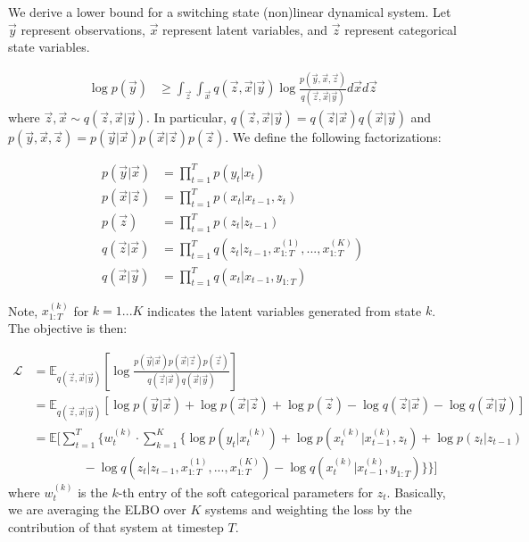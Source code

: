 \documentclass[12pt]{article}
\begin{document}
We derive a lower bound for a switching state (non)linear dynamical system. Let $\vec{y}$ represent observations, $\vec{x}$ represent latent variables, and $\vec{z}$ represent categorical state variables.

\begin{align}
    \log p(\vec{y}) &\geq \int_{\vec{z}} \int_{\vec{x}} q(\vec{z},\vec{x}|\vec{y}) \log \frac{p(\vec{y},\vec{x},\vec{z})}{q(\vec{z},\vec{x}|\vec{y})} d\vec{x} d\vec{z}
\end{align}
where $\vec{z},\vec{x} \sim q(\vec{z},\vec{x}|\vec{y})$. In particular, $q(\vec{z},\vec{x}|\vec{y}) = q(\vec{z}|\vec{x})q(\vec{x}|\vec{y})$ and $p(\vec{y},\vec{x},\vec{z}) = p(\vec{y}|\vec{x})p(\vec{x}|\vec{z})p(\vec{z})$. We define the following factorizations:

\begin{align}
    p(\vec{y}|\vec{x}) &= \prod_{t=1}^T p(y_t|x_t) \\
    p(\vec{x}|\vec{z}) &= \prod_{t=1}^T p(x_t|x_{t-1},z_t) \\
    p(\vec{z}) &= \prod_{t=1}^T p(z_t|z_{t-1}) \\
    q(\vec{z}|\vec{x}) &= \prod_{t=1}^T q(z_t|z_{t-1},x^{(1)}_{1:T},...,x^{(K)}_{1:T}) \\
    q(\vec{x}|\vec{y}) &= \prod_{t=1}^T q(x_t|x_{t-1},y_{1:T})
\end{align}

Note, $x^{(k)}_{1:T}$ for $k=1...K$ indicates the latent variables generated from state $k$. The objective is then:

\begin{align}
    \mathcal{L} &= \mathbb{E}_{q(\vec{z},\vec{x}|\vec{y})}[\log \frac{p(\vec{y}|\vec{x})p(\vec{x}|\vec{z})p(\vec{z})}{q(\vec{z}|\vec{x})q(\vec{x}|\vec{y})}] \\
    &= \mathbb{E}_{q(\vec{z},\vec{x}|\vec{y})}[\log p(\vec{y}|\vec{x}) + \log p(\vec{x}|\vec{z}) + \log p(\vec{z}) - \log q(\vec{z}|\vec{x}) - \log q(\vec{x}|\vec{y})] \\
    &= \mathbb{E}[\sum_{t=1}^T \{ w_t^{(k)} \cdot \sum_{k=1}^K \{ \log p(y_t|x^{(k)}_t) + \log p(x^{(k)}_t|x^{(k)}_{t-1},z_t) + \log p(z_t|z_{t-1}) \\ &\qquad\qquad - \log q(z_t|z_{t-1},x^{(1)}_{1:T},...,x^{(K)}_{1:T}) - \log q(x^{(k)}_t|x^{(k)}_{t-1},y_{1:T}) \} \} ]
\end{align}
where $w_t^{(k)}$ is the $k$-th entry of the soft categorical parameters for $z_t$. Basically, we are averaging the ELBO over $K$ systems and weighting the loss by the contribution of that system at timestep $T$.
\end{document}
